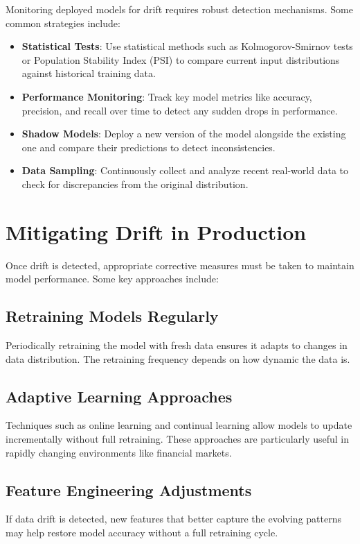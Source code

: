 \documentclass[12pt,openany]{book}
\begin{document}
Monitoring deployed models for drift requires robust detection mechanisms. Some common strategies include:

\begin{itemize}
    \item \textbf{Statistical Tests}: Use statistical methods such as Kolmogorov-Smirnov tests or Population Stability Index (PSI) to compare current input distributions against historical training data.
    \item \textbf{Performance Monitoring}: Track key model metrics like accuracy, precision, and recall over time to detect any sudden drops in performance.
    \item \textbf{Shadow Models}: Deploy a new version of the model alongside the existing one and compare their predictions to detect inconsistencies.
    \item \textbf{Data Sampling}: Continuously collect and analyze recent real-world data to check for discrepancies from the original distribution.
\end{itemize}



\section{Mitigating Drift in Production}

Once drift is detected, appropriate corrective measures must be taken to maintain model performance. Some key approaches include:


\subsection{Retraining Models Regularly}
Periodically retraining the model with fresh data ensures it adapts to changes in data distribution. The retraining frequency depends on how dynamic the data is.


\subsection{Adaptive Learning Approaches}
Techniques such as online learning and continual learning allow models to update incrementally without full retraining. These approaches are particularly useful in rapidly changing environments like financial markets.


\subsection{Feature Engineering Adjustments}
If data drift is detected, new features that better capture the evolving patterns may help restore model accuracy without a full retraining cycle.
\end{document}
